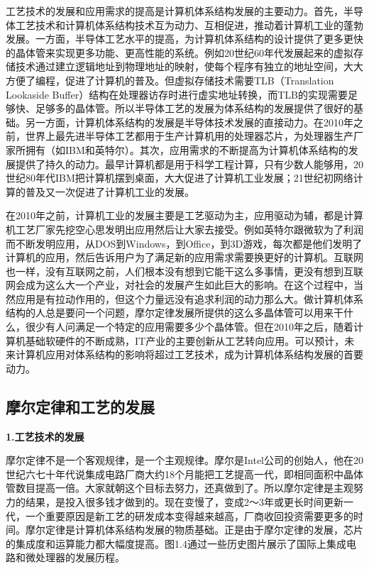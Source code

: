 \documentclass[]{ctexbook}
\begin{document}
工艺技术的发展和应用需求的提高是计算机体系结构发展的主要动力。首先，半导体工艺技术和计算机体系结构技术互为动力、互相促进，推动着计算机工业的蓬勃发展。一方面，半导体工艺水平的提高，为计算机体系结构的设计提供了更多更快的晶体管来实现更多功能、更高性能的系统。例如20世纪60年代发展起来的虚拟存储技术通过建立逻辑地址到物理地址的映射，使每个程序有独立的地址空间，大大方便了编程，促进了计算机的普及。但虚拟存储技术需要TLB（Translation Lookaside Buffer）结构在处理器访存时进行虚实地址转换，而TLB的实现需要足够快、足够多的晶体管。所以半导体工艺的发展为体系结构的发展提供了很好的基础。另一方面，计算机体系结构的发展是半导体技术发展的直接动力。在2010年之前，世界上最先进半导体工艺都用于生产计算机用的处理器芯片，为处理器生产厂家所拥有（如IBM和英特尔）。其次，应用需求的不断提高为计算机体系结构的发展提供了持久的动力。最早计算机都是用于科学工程计算，只有少数人能够用，20世纪80年代IBM把计算机摆到桌面，大大促进了计算机工业发展；21世纪初网络计算的普及又一次促进了计算机工业的发展。

在2010年之前，计算机工业的发展主要是工艺驱动为主，应用驱动为辅，都是计算机工艺厂家先挖空心思发明出应用然后让大家去接受。例如英特尔跟微软为了利润而不断发明应用，从DOS到Windows，到Office，到3D游戏，每次都是他们发明了计算机的应用，然后告诉用户为了满足新的应用需求需要换更好的计算机。互联网也一样，没有互联网之前，人们根本没有想到它能干这么多事情，更没有想到互联网会成为这么大一个产业，对社会的发展产生如此巨大的影响。在这个过程中，当然应用是有拉动作用的，但这个力量远没有追求利润的动力那么大。做计算机体系结构的人总是要问一个问题，摩尔定律发展所提供的这么多晶体管可以用来干什么，很少有人问满足一个特定的应用需要多少个晶体管。但在2010年之后，随着计算机基础软硬件的不断成熟，IT产业的主要创新从工艺转向应用。可以预计，未来计算机应用对体系结构的影响将超过工艺技术，成为计算机体系结构发展的首要动力。

\hypertarget{ux6469ux5c14ux5b9aux5f8bux548cux5de5ux827aux7684ux53d1ux5c55}{%
\subsection{摩尔定律和工艺的发展}\label{ux6469ux5c14ux5b9aux5f8bux548cux5de5ux827aux7684ux53d1ux5c55}}

\textbf{1.工艺技术的发展}

摩尔定律不是一个客观规律，是一个主观规律。摩尔是Intel公司的创始人，他在20世纪六七十年代说集成电路厂商大约18个月能把工艺提高一代，即相同面积中晶体管数目提高一倍。大家就朝这个目标去努力，还真做到了。所以摩尔定律是主观努力的结果，是投入很多钱才做到的。现在变慢了，变成2～3年或更长时间更新一代，一个重要原因是新工艺的研发成本变得越来越高，厂商收回投资需要更多的时间。摩尔定律是计算机体系结构发展的物质基础。正是由于摩尔定律的发展，芯片的集成度和运算能力都大幅度提高。图1.4通过一些历史图片展示了国际上集成电路和微处理器的发展历程。
\end{document}
